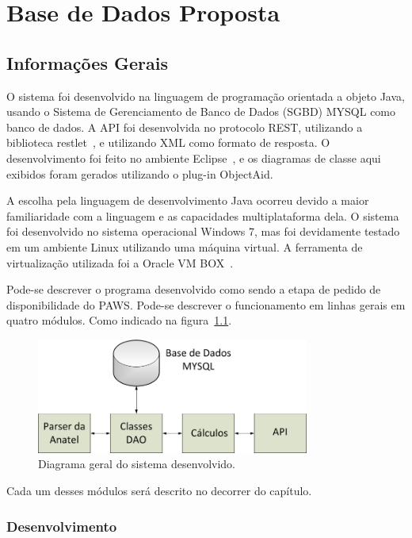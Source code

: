 \chapter{Base de Dados Proposta}

\section{Informações Gerais}

O sistema foi desenvolvido na linguagem de programação orientada a objeto Java, usando o Sistema de Gerenciamento de Banco de Dados (SGBD)
MYSQL como banco de dados. A API foi desenvolvida no protocolo REST, utilizando a biblioteca restlet~\cite{restlet}, e utilizando XML como formato de resposta. O desenvolvimento foi feito no ambiente Eclipse~\cite{eclipse}, e os diagramas de classe aqui exibidos foram gerados utilizando o plug-in ObjectAid.

A escolha pela linguagem de desenvolvimento Java ocorreu devido a maior familiaridade com a linguagem e as capacidades multiplataforma dela. O sistema foi desenvolvido no sistema operacional Windows 7, mas foi devidamente testado em um ambiente Linux utilizando uma máquina virtual. A ferramenta de virtualização utilizada foi a Oracle VM BOX~\cite{vmbox}.

Pode-se descrever o programa desenvolvido como sendo a etapa de pedido de disponibilidade do PAWS. Pode-se descrever o funcionamento em linhas gerais em quatro módulos. Como indicado na figura~\ref{fig:SAM}.

\begin{figure}[htb]
\centering
\includegraphics[width=0.8\textwidth]{figs/sam}
\caption[\textit{Diagrama do Sistema Desenvolvido}.]
{Diagrama geral do sistema desenvolvido.}
\label{fig:SAM}
\end{figure} 


Cada um desses módulos será descrito no decorrer do capítulo.


\subsection{Desenvolvimento}

